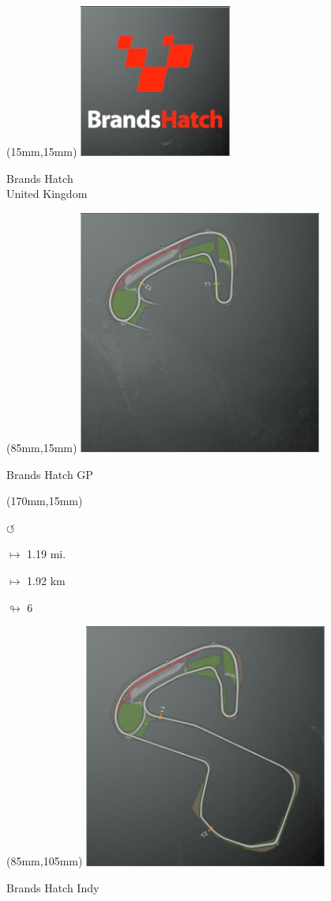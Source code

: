 \begin{textblock*}{60mm}(15mm,15mm)%
\includegraphics[width=50mm]{LG/2015-05-20_00074.png}
\par Brands Hatch\\ United Kingdom
\end{textblock*}
\begin{textblock*}{80mm}(85mm,15mm)%
\includegraphics[width=80mm]{TR/2015-05-20_00008.png}
\centerline{Brands Hatch GP}
\end{textblock*}
\begin{textblock*}{30mm}(170mm,15mm)%
\par \Huge$\circlearrowleft$
\Large
\par$\mapsto$ 1.19 mi.
\par$\mapsto$ 1.92 km
\par$\looparrowright$ 6
\end{textblock*}
\begin{textblock*}{80mm}(85mm,105mm)%
\includegraphics[width=80mm]{TR/2015-05-20_00007.png}
\centerline{Brands Hatch Indy}
\end{textblock*}
